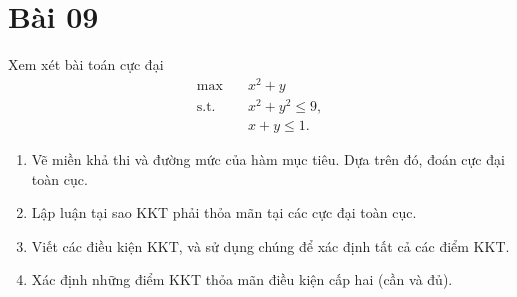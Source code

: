 \section{Bài 09}
Xem xét bài toán cực đại
\begin{equation}
    \label{problem:09}
    \begin{aligned}
        \max \quad & x^2 + y\\
        \textrm{s.t.} \quad & x^2 + y^2 \leq 9,\\
        &x + y \leq 1.
    \end{aligned}
\end{equation}
\begin{enumerate}[label=(\alph*)]
    \item Vẽ miền khả thi và đường mức của hàm mục tiêu. Dựa trên đó, đoán cực đại toàn cục.
    \item Lập luận tại sao KKT phải thỏa mãn tại các cực đại toàn cục.
    \item Viết các điều kiện KKT, và sử dụng chúng để xác định tất cả các điểm KKT.
    \item Xác định những điểm KKT thỏa mãn điều kiện cấp hai (cần và đủ).
\end{enumerate}

